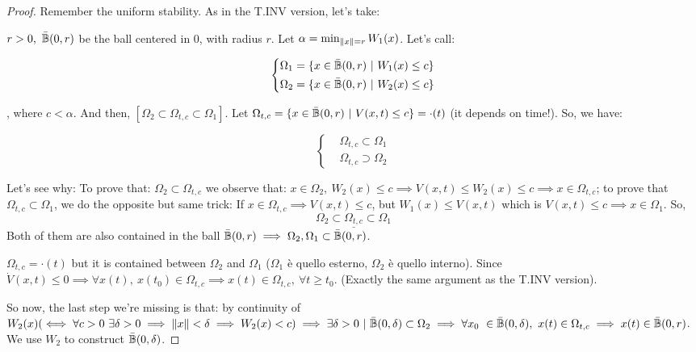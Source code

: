 \begin{proof}
Remember the uniform stability. As in the T.INV version, let's take:

$r > 0,\ \bar{\mathbb{B}}(0,r)$ be the ball centered in 0, with radius $r$. Let $\alpha = \min_{\lVert x\rVert=r}{W_1(x)}$. Let's call:

\[
	\left\{
	\begin{aligned}
	&\Omega_1 = \{x \in \bar{\mathbb{B}}(0,r)\ |\ W_1(x) \leq c\} \\
	&\Omega_2 = \{x \in \bar{\mathbb{B}}(0,r)\ |\ W_2(x) \leq c\}
	\end{aligned} 
	\right.
\]

, where $c < \alpha$. And then, $[\Omega_2 \subset \Omega_{t,c} \subset \Omega_1]$. Let $\Omega_{t,c}=\{x \in \cball(0,r)\ |\ V(x,t) \leq c\} = \mathord{\cdot}(t)$ (it depends on time!). So, we have:

\[
	\left\{
	\begin{aligned}
	&\Omega_{t,c} \subset \Omega_1 \\
	&\Omega_{t,c} \supset \Omega_2
	\end{aligned} 
	\right.
\]

Let's see why: To prove that: $\Omega_2 \subset \Omega_{t,c}$ we observe that: $x \in \Omega_2,\ W_2(x) \leq c \implies V(x,t) \leq W_2(x) \leq c \implies x \in \Omega_{t,c}$; to prove that $\Omega_{t,c} \subset \Omega_1$, we do the opposite but same trick: If $x \in \Omega_{t,c} \implies V(x,t) \leq c$, but $W_1(x) \leq V(x,t)$ which is $V(x,t) \leq c \implies x \in \Omega_1$. So,
\[
	\underline{\Omega_2 \subset \Omega_{t,c} \subset \Omega_1}
\]
Both of them are also contained in the ball $\bar{\mathbb{B}}(0,r) \implies \Omega_2,\Omega_1 \subset \bar{\mathbb{B}}(0,r)$.

$\Omega_{t,c} = \mathord{\cdot}(t)$ but it is contained between $\Omega_2$ and $\Omega_1$ ($\Omega_1$ è quello esterno, $\Omega_2$ è quello interno). Since $\dot{V}(x,t) \leq 0 \implies \forall x(t),\ x(t_0) \in \Omega_{t,c} \implies x(t) \in \Omega_{t,c},\ \forall t \geq t_0$. (Exactly the same argument as the T.INV version).

So now, the last step we're missing is that: by continuity of $W_2(x) (\iff \forall c > 0\ \exists \delta > 0 \implies \lVert x\rVert<\delta \implies W_2(x) < c) \implies \exists \delta > 0\ |\ \bar{\mathbb{B}}(0,\delta) \subset \Omega_2 \implies \forall x_0\ \in \bar{\mathbb{B}}(0,\delta),\ x(t) \in \Omega_{t,c} \implies x(t) \in \bar{\mathbb{B}}(0,r)$. 
We use $W_2$ to construct $\bar{\mathbb{B}}(0,\delta)$. 
\end{proof}

